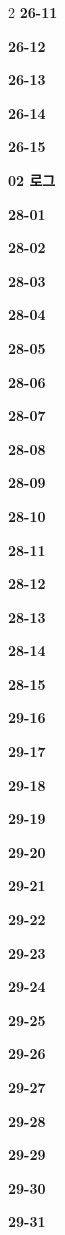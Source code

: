 \documentclass[10pt,a4paper]{article}
\begin{document}
\begin{multicols}{2}
\noindent\textbf{26-11}\ \par
\noindent\textbf{26-12}\ \par
\noindent\textbf{26-13}\ \par
\noindent\textbf{26-14}\ \par
\noindent\textbf{26-15}\ \par
\noindent\textbf{02 로그}\par\smallskip
\noindent\textbf{28-01}\ \par
\noindent\textbf{28-02}\ \par
\noindent\textbf{28-03}\ \par
\noindent\textbf{28-04}\ \par
\noindent\textbf{28-05}\ \par
\noindent\textbf{28-06}\ \par
\noindent\textbf{28-07}\ \par
\noindent\textbf{28-08}\ \par
\noindent\textbf{28-09}\ \par
\noindent\textbf{28-10}\ \par
\noindent\textbf{28-11}\ \par
\noindent\textbf{28-12}\ \par
\noindent\textbf{28-13}\ \par
\noindent\textbf{28-14}\ \par
\noindent\textbf{28-15}\ \par
\noindent\textbf{29-16}\ \par
\noindent\textbf{29-17}\ \par
\noindent\textbf{29-18}\ \par
\noindent\textbf{29-19}\ \par
\noindent\textbf{29-20}\ \par
\noindent\textbf{29-21}\ \par
\noindent\textbf{29-22}\ \par
\noindent\textbf{29-23}\ \par
\noindent\textbf{29-24}\ \par
\noindent\textbf{29-25}\ \par
\noindent\textbf{29-26}\ \par
\noindent\textbf{29-27}\ \par
\noindent\textbf{29-28}\ \par
\noindent\textbf{29-29}\ \par
\noindent\textbf{29-30}\ \par
\noindent\textbf{29-31}\ \par

\end{multicols}
\end{document}
